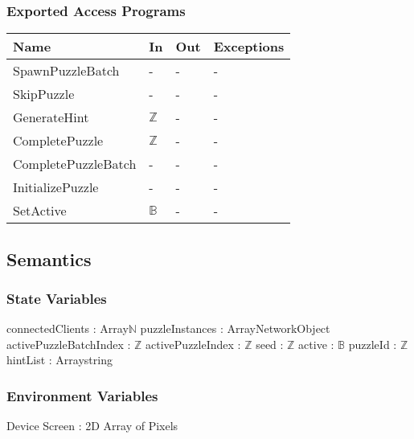\documentclass[12pt, titlepage]{article}
\begin{document}
\subsubsection{Exported Access Programs}

\begin{center}
\begin{tabular}{p{4cm} p{3cm} p{3cm} p{3cm}}
\hline
\textbf{Name} & \textbf{In} & \textbf{Out} & \textbf{Exceptions} \\
\hline
SpawnPuzzleBatch & - & - & - \\
SkipPuzzle & - & - & - \\
GenerateHint & $\mathds{Z}$ & - & - \\
CompletePuzzle & $\mathds{Z}$ & - & - \\
CompletePuzzleBatch & - & - & - \\
InitializePuzzle & - & - & - \\
SetActive & $\mathds{B}$ & - & - \\
\hline
\end{tabular}
\end{center}

\subsection{Semantics}

\subsubsection{State Variables}

connectedClients : Array\textlangle$\mathds{N}$\textrangle\newline
puzzleInstances : Array\textlangle NetworkObject\textrangle\newline
activePuzzleBatchIndex : $\mathds{Z}$\newline
activePuzzleIndex : $\mathds{Z}$\newline
seed : $\mathds{Z}$\newline
active : $\mathds{B}$\newline
puzzleId : $\mathds{Z}$ \newline
hintList : Array\textlangle string\textrangle

\subsubsection{Environment Variables}

Device Screen : 2D Array of Pixels 
\end{document}
